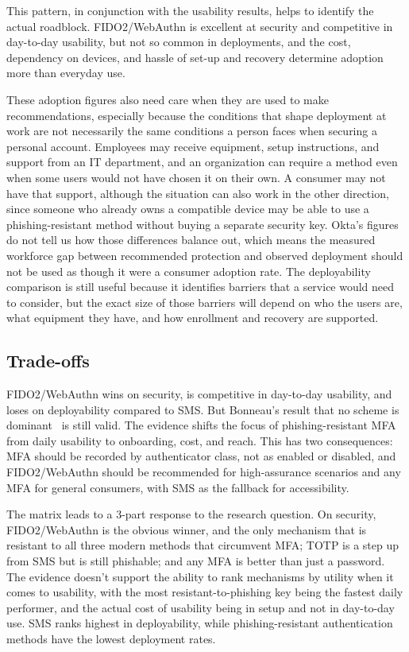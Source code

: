 \documentclass[sigconf]{acmart}
\begin{document}
This pattern, in conjunction with the
usability results, helps to identify the actual roadblock. FIDO2/WebAuthn is excellent at security
and competitive in day-to-day usability, but not so common in deployments, and the cost, dependency
on devices, and hassle of set-up and recovery determine adoption more than everyday use.

These adoption figures also need care when they are used to make recommendations, especially because the conditions that shape deployment at work are not necessarily the same conditions a person faces when securing a personal account. Employees may receive equipment, setup instructions, and support from an IT department, and an organization can require a method even when some users would not have chosen it on their own. A consumer may not have that support, although the situation can also work in the other direction, since someone who already owns a compatible device may be able to use a phishing-resistant method without buying a separate security key. Okta's figures do not tell us how those differences balance out, which means the measured workforce gap between recommended protection and observed deployment should not be used as though it were a consumer adoption rate. The deployability comparison is still useful because it identifies barriers that a service would need to consider, but the exact size of those barriers will depend on who the users are, what equipment they have, and how enrollment and recovery are supported.

\subsection{Trade-offs}

FIDO2/WebAuthn wins on
security, is competitive in day-to-day usability, and loses on
deployability compared to SMS\@. But Bonneau's result that no scheme is
dominant~\cite{bonneau:2012:quest} is still valid. The evidence shifts the
focus of phishing-resistant MFA from daily usability to onboarding, cost,
and reach. This has two consequences: MFA should be recorded by
authenticator class, not as enabled or disabled, and FIDO2/WebAuthn should be recommended for high-assurance scenarios and any MFA for general consumers, with SMS as the fallback for accessibility.

The matrix leads to a 3-part response to the research question. On security, FIDO2/WebAuthn is the
obvious winner, and the only mechanism that is resistant to all three modern methods
that circumvent MFA; TOTP is a step up from SMS but is still phishable; and any MFA is better
than just a password. The evidence doesn't support the ability to rank mechanisms by utility when it
comes to usability, with the most resistant-to-phishing key being the fastest daily performer, and
the actual cost of usability being in setup and not in day-to-day use. SMS ranks highest in deployability, while phishing-resistant authentication methods have the lowest deployment rates.
\end{document}
